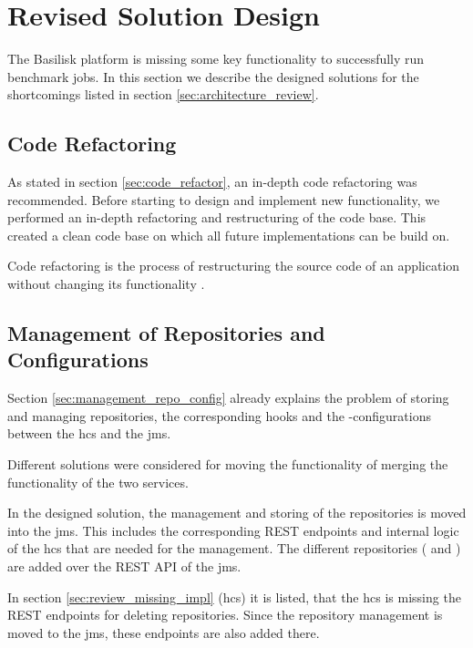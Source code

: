 \section{Revised Solution Design}
\label{sec:revised_solution_design}

The Basilisk platform is missing some key functionality to successfully run benchmark jobs.
In this section we describe the designed solutions for the shortcomings listed in section \ref{sec:architecture_review}.



\subsection{Code Refactoring}
\label{sec:impl_code_refactor}
As stated in section \ref{sec:code_refactor}, an in-depth code refactoring was recommended.
Before starting to design and implement new functionality, we performed an in-depth refactoring and restructuring of the code base.
This created a clean code base on which all future implementations can be build on.

Code refactoring is the process of restructuring the source code of an application without changing its functionality \cite{fowlerRefactoringImprovingDesign2019a}.


\subsection{Management of Repositories and Configurations}
\label{sec:management_repo_config_design}
Section \ref{sec:management_repo_config} already explains the problem of storing and managing repositories, the corresponding hooks and the \ts{}-configurations between the \acf{hcs} and the \acf{jms}.

Different solutions were considered for moving the functionality of merging the functionality of the two services.

In the designed solution, the management and storing of the repositories is moved into the \ac{jms}.
This includes the corresponding REST endpoints and internal logic of the \ac{hcs} that are needed for the management.
The different repositories (\gh{} and \dockh{}) are added over the REST API of the \ac{jms}.

In section \ref{sec:review_missing_impl} (\acl{hcs}) it is listed, that the \ac{hcs} is missing the REST endpoints for deleting repositories.
Since the repository management is moved to the \ac{jms}, these endpoints are also added there.
\\

